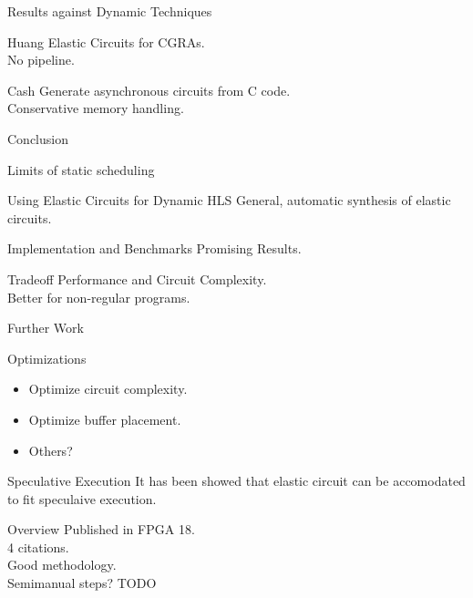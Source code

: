 \documentclass[page number]{beamer}
\begin{document}
\begin{frame}{Results against Dynamic Techniques}
  \begin{block}{Huang}
    Elastic Circuits for CGRAs.\\
    No pipeline.
  \end{block}
  \vfill
  \begin{block}{Cash}
    Generate asynchronous circuits from C code.\\
    Conservative memory handling.
  \end{block}
  \vfill
  \tiny
  \hspace*{-8pt}
\end{frame}

\begin{frame}{Conclusion}
  \begin{alertblock}{Limits of static scheduling}
  \end{alertblock}
  \vfill
  \begin{exampleblock}{Using Elastic Circuits for Dynamic HLS}
    General, automatic synthesis of elastic circuits.
  \end{exampleblock}
  \vfill
  \begin{exampleblock}{Implementation and Benchmarks}
    Promising Results.
  \end{exampleblock}
  \vfill
  \begin{block}{Tradeoff}
    Performance and Circuit Complexity.\\
    Better for non-regular programs.
  \end{block}
\end{frame}

\begin{frame}{Further Work}
  \begin{block}{Optimizations}
    \begin{itemize}
    \item Optimize circuit complexity.
    \item Optimize buffer placement.
    \item Others?
    \end{itemize}
  \end{block}
  \vfill
  \begin{block}{Speculative Execution}
    It has been showed that elastic circuit can be accomodated to fit speculaive execution.
  \end{block}
\end{frame}

\begin{frame}{Overview}
  Published in FPGA 18.\\
  4 citations.\\
  Good methodology.\\
  Semimanual steps?
  \vfill
  TODO
  
\end{frame}
    
\end{document}
